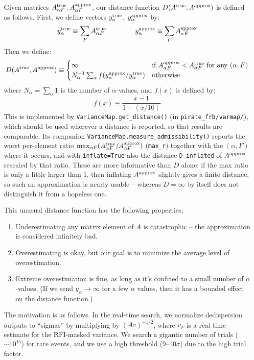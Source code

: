 \documentclass{article}
\numberwithin{equation}{section}   %
\begin{document}
Given matrices $A^{\rm true}_{\alpha F}, A^{\rm approx}_{\alpha F}$,
our distance function $D(A^{\rm true}, A^{\rm approx})$ is defined as follows.
First, we define vectors
$y^{\rm true}_{\alpha}$, $y^{\rm approx}_{\alpha}$ by:
\begin{equation}
y^{\rm true}_{\alpha} \equiv \sum_F A^{\rm true}_{\alpha F}
  \hspace{1.5cm}
y^{\rm approx}_{\alpha} \equiv \sum_F A^{\rm approx}_{\alpha F}
\label{eq:ytrue_def}
\end{equation}
Then we define:
\begin{equation}
D(A^{\rm true}, A^{\rm approx})
 \equiv \begin{cases}
   \infty & \mbox{if $A^{\rm approx}_{\alpha F} < A^{\rm true}_{\alpha F}$ for any $(\alpha,F)$} \\
   N_\alpha^{-1} \sum_\alpha f(y_\alpha^{\rm approx}/y_\alpha^{\rm true})
    & \mbox{otherwise}
\end{cases} 
\label{eq:distance_function}
\end{equation}
where $N_\alpha = \sum_\alpha 1$ is the number of $\alpha$-values, and $f(x)$ is defined by:
\begin{equation}
f(x) \equiv \frac{x-1}{1+(x/10)}
\end{equation}
This is implemented by \verb|VarianceMap.get_distance()| (in \verb|pirate_frb/varmap/|),
which should be used wherever a distance is reported, so that results are comparable.
Its companion \verb|VarianceMap.measure_admissibility()| reports the worst per-element ratio
$\max_{\alpha F} (A^{\rm true}_{\alpha F} / A^{\rm approx}_{\alpha F})$ (\verb|max_r|)
together with the $(\alpha,F)$ where it occurs, and with \verb|inflate=True| also the distance
\verb|D_inflated| of $A^{\rm approx}$ rescaled by that ratio. These are more informative than
$D$ alone: if the max ratio is only a little larger than $1$, then inflating $A^{\rm approx}$
slightly gives a finite distance, so such an approximation is nearly usable -- whereas
$D = \infty$ by itself does not distinguish it from a hopeless one.

This unusual distance function has the following properties:
\begin{enumerate}
\item Underestimating any matrix element of $A$ is catastrophic -- the approximation
 is considered infinitely bad.
\item Overestimating is okay, but our goal is to minimize the average level of
 overestimation.
\item Extreme overestimation is fine, as long as it's confined to a small number
 of $\alpha$-values. (If we send $y_\alpha \rightarrow \infty$ for a few $\alpha$
 values, then it has a bounded effect on the distance function.)
\end{enumerate}
The motivation is as follows.
In the real-time search, we normalize dedispersion outputs to ``sigmas'' by multiplying
by $(Av)^{-1/2}$, where $v_F$ is a real-time estimate for the RFI-masked variance.
We search a gigantic number of trials ($\sim\!10^{15}$) for rare events, and we use
a high threshold (9--10$\sigma$) due to the high trial factor.
\end{document}
